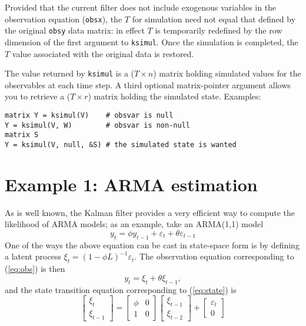 \documentclass[a4paper]{article}
\begin{document}
Provided that the current filter does not include exogenous variables
in the observation equation (\texttt{obsx}), the $T$ for simulation
need not equal that defined by the original \texttt{obsy} data matrix:
in effect $T$ is temporarily redefined by the row dimension of the
first argument to \texttt{ksimul}.  Once the simulation is completed,
the $T$ value associated with the original data is restored.

The value returned by \texttt{ksimul} is a ($T \times n$) matrix
holding simulated values for the observables at each time step.  A
third optional matrix-pointer argument allows you to retrieve a ($T
\times r$) matrix holding the simulated state.  Examples:
%
\begin{verbatim}
matrix Y = ksimul(V)    # obsvar is null
Y = ksimul(V, W)        # obsvar is non-null
matrix S
Y = ksimul(V, null, &S) # the simulated state is wanted
\end{verbatim}

\section{Example 1: ARMA estimation}
\label{sec:example_arma}

As is well known, the Kalman filter provides a very efficient way to
compute the likelihood of ARMA models; as an example, take an
ARMA(1,1) model
\[
  y_t = \phi y_{t-1} + \varepsilon_t + \theta \varepsilon_{t-1}
\]
One of the ways the above equation can be cast in state-space form is
by defining a latent process $\xi_t = (1 - \phi L)^{-1}
\varepsilon_t$.   The observation equation corresponding to (\ref{eq:obs})
is then
%
\begin{equation}
y_t = \xi_t + \theta \xi_{t-1} ,\label{eq:arma-meas}
\end{equation}
%
and the state transition equation corresponding to (\ref{eq:state}) is
%
\[
  \left[ \begin{array}{c} \xi_t \\ \xi_{t-1} \end{array} \right] =
  \left[ \begin{array}{cc} \phi & 0 \\ 1 & 0 \end{array} \right]
  \left[ \begin{array}{c} \xi_{t-1} \\ \xi_{t-2} \end{array} \right] +
  \left[ \begin{array}{c} \varepsilon_t \\ 0 \end{array} \right] 
\]
\end{document}

